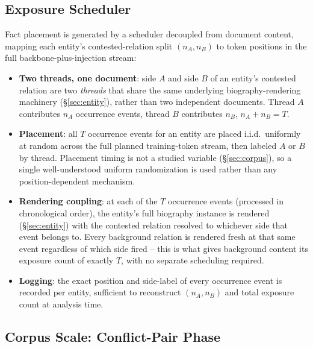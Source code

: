 \documentclass[11pt]{article}
\begin{document}
\subsection{Exposure Scheduler}
\label{sec:scheduler}

Fact placement is generated by a scheduler decoupled from document content,
mapping each entity's contested-relation split $(n_A, n_B)$ to token
positions in the full backbone-plus-injection stream:

\begin{itemize}
  \item \textbf{Two threads, one document}: side $A$ and side $B$ of an
    entity's contested relation are two \emph{threads} that share the same
    underlying biography-rendering machinery (\S\ref{sec:entity}), rather
    than two independent documents. Thread $A$ contributes $n_A$ occurrence
    events, thread $B$ contributes $n_B$, $n_A + n_B = T$.
  \item \textbf{Placement}: all $T$ occurrence events for an entity are
    placed i.i.d.\ uniformly at random across the full planned
    training-token stream, then labeled $A$ or $B$ by thread. Placement
    timing is not a studied variable (\S\ref{sec:corpus}), so a single
    well-understood uniform randomization is used rather than any
    position-dependent mechanism.
  \item \textbf{Rendering coupling}: at each of the $T$ occurrence events
    (processed in chronological order), the entity's full biography instance
    is rendered (\S\ref{sec:entity}) with the contested relation resolved to
    whichever side that event belongs to. Every background relation is
    rendered fresh at that same event regardless of which side fired -- this
    is what gives background content its exposure count of exactly $T$, with
    no separate scheduling required.
  \item \textbf{Logging}: the exact position and side-label of every
    occurrence event is recorded per entity, sufficient to reconstruct
    $(n_A, n_B)$ and total exposure count at analysis time.
\end{itemize}

\subsection{Corpus Scale: Conflict-Pair Phase}
\label{sec:scale}
\end{document}
